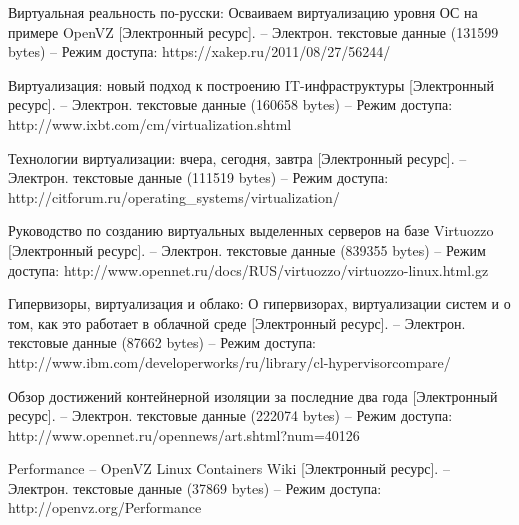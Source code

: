 \begin{thebibliography}{00}
    Виртуальная реальность по-русски: Осваиваем виртуализацию уровня ОС на примере OpenVZ
    [Электронный ресурс]. --
    Электрон. текстовые данные (131599 bytes) --
    Режим доступа: https://xakep.ru/2011/08/27/56244/

    Виртуализация: новый подход к построению IT-инфраструктуры
    [Электронный ресурс]. --
    Электрон. текстовые данные (160658 bytes) --
    Режим доступа: http://www.ixbt.com/cm/virtualization.shtml

    Технологии виртуализации: вчера, сегодня, завтра
    [Электронный ресурс]. --
    Электрон. текстовые данные (111519 bytes) --
    Режим доступа: http://citforum.ru/operating\_systems/virtualization/

    Руководство по созданию виртуальных выделенных серверов на базе Virtuozzo
    [Электронный ресурс]. --
    Электрон. текстовые данные (839355 bytes) --
    Режим доступа: http://www.opennet.ru/docs/RUS/virtuozzo/virtuozzo-linux.html.gz

    Гипервизоры, виртуализация и облако: О гипервизорах, виртуализации систем и о том, как это работает в облачной среде
    [Электронный ресурс]. --
    Электрон. текстовые данные (87662 bytes) --
    Режим доступа: http://www.ibm.com/developerworks/ru/library/cl-hypervisorcompare/

    Обзор достижений контейнерной изоляции за последние два года
    [Электронный ресурс]. --
    Электрон. текстовые данные (222074 bytes) -- 
    Режим доступа: http://www.opennet.ru/opennews/art.shtml?num=40126

    Performance -- OpenVZ Linux Containers Wiki
    [Электронный ресурс]. --
    Электрон. текстовые данные (37869 bytes) --
    Режим доступа: http://openvz.org/Performance

\end{thebibliography}
\endgroup

\clearpage
